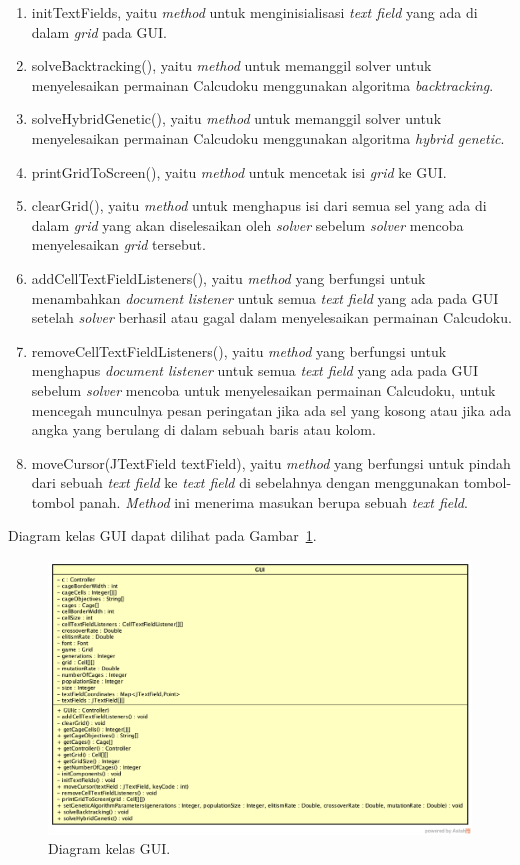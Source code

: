 \begin{enumerate}
\item initTextFields, yaitu \textit{method} untuk menginisialisasi \textit{text field} yang ada di dalam \textit{grid} pada GUI.
\item solveBacktracking(), yaitu \textit{method} untuk memanggil solver untuk menyelesaikan permainan Calcudoku menggunakan algoritma \textit{backtracking}. 
\item solveHybridGenetic(), yaitu \textit{method} untuk memanggil solver untuk menyelesaikan permainan Calcudoku menggunakan algoritma \textit{hybrid genetic}.
\item printGridToScreen(), yaitu \textit{method} untuk mencetak isi \textit{grid} ke GUI.
\item clearGrid(), yaitu \textit{method} untuk menghapus isi dari semua sel yang ada di dalam \textit{grid} yang akan diselesaikan oleh \textit{solver} sebelum \textit{solver} mencoba menyelesaikan \textit{grid} tersebut.
\item addCellTextFieldListeners(), yaitu \textit{method} yang berfungsi untuk menambahkan \textit{document listener} untuk semua \textit{text field} yang ada pada GUI setelah \textit{solver} berhasil atau gagal dalam menyelesaikan permainan Calcudoku.
\item removeCellTextFieldListeners(), yaitu \textit{method} yang berfungsi untuk menghapus \textit{document listener} untuk semua \textit{text field} yang ada pada GUI sebelum \textit{solver} mencoba untuk menyelesaikan permainan Calcudoku, untuk mencegah munculnya pesan peringatan jika ada sel yang kosong atau jika ada angka yang berulang di dalam sebuah baris atau kolom.
\item moveCursor(JTextField textField), yaitu \textit{method} yang berfungsi untuk pindah dari sebuah \textit{text field} ke \textit{text field} di sebelahnya dengan menggunakan tombol-tombol panah. \textit{Method} ini menerima masukan berupa sebuah \textit{text field}.
\end{enumerate}

Diagram kelas GUI dapat dilihat pada Gambar~\ref{fig:diagramkelasgui}.

\begin{figure}
\centering
\captionsetup{justification=centering}
\includegraphics[scale=0.3]{Gambar/Perancangan/DiagramKelasGUI.png}
\caption[Diagram kelas GUI.]{Diagram kelas GUI.}
\label{fig:diagramkelasgui}
\end{figure}

